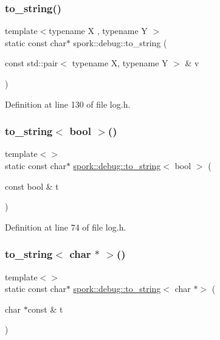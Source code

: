 \subsubsection{\texorpdfstring{to\+\_\+string()}{to\_string()}\hspace{0.1cm}{\footnotesize\ttfamily [2/2]}}
{\footnotesize\ttfamily template$<$typename X , typename Y $>$ \\
static const char$\ast$ spork\+::debug\+::to\+\_\+string (\begin{DoxyParamCaption}\item[{const std\+::pair$<$ typename X, typename Y $>$ \&}]{v }\end{DoxyParamCaption})\hspace{0.3cm}{\ttfamily [static]}}



Definition at line 130 of file log.\+h.

\mbox{\label{namespacespork_1_1debug_a34c91e829f04513719a850e5806a506e}} 
\subsubsection{\texorpdfstring{to\+\_\+string$<$ bool $>$()}{to\_string< bool >()}}
{\footnotesize\ttfamily template$<$$>$ \\
static const char$\ast$ \hyperlink{namespacespork_1_1debug_afc2bf363eb52ab11d27418006ad8e210}{spork\+::debug\+::to\+\_\+string}$<$ bool $>$ (\begin{DoxyParamCaption}\item[{const bool \&}]{t }\end{DoxyParamCaption})\hspace{0.3cm}{\ttfamily [static]}}



Definition at line 74 of file log.\+h.

\mbox{\label{namespacespork_1_1debug_aaa53753be4d2d27251764c381778aa38}} 
\subsubsection{\texorpdfstring{to\+\_\+string$<$ char $\ast$ $>$()}{to\_string< char * >()}}
{\footnotesize\ttfamily template$<$$>$ \\
static const char$\ast$ \hyperlink{namespacespork_1_1debug_afc2bf363eb52ab11d27418006ad8e210}{spork\+::debug\+::to\+\_\+string}$<$ char $\ast$$>$ (\begin{DoxyParamCaption}\item[{char $\ast$const \&}]{t }\end{DoxyParamCaption})\hspace{0.3cm}{\ttfamily [static]}}



